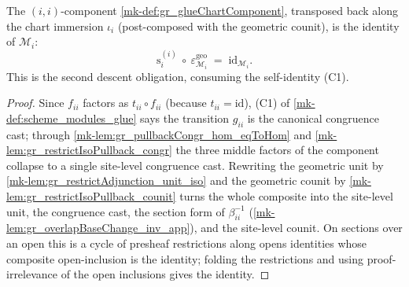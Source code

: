 \begin{lemma}\label{mk-lem:gr_glueChartComponent_self_counit}
  \leanok

  The \((i,i)\)-component \ref{mk-def:gr_glueChartComponent}, transposed back along the
  chart immersion \(\iota_i\) (post-composed with the geometric counit), is the
  identity of \(\mathcal{M}_i\):
  \[
    \mathrm{s}_i^{(i)}\ \circ\ \varepsilon^{\mathrm{geo}}_{\mathcal{M}_i}
      \;=\; \mathrm{id}_{\mathcal{M}_i}.
  \]
  This is the second descent obligation, consuming the self-identity (C1).
\end{lemma}
\begin{proof}
  \leanok
    Since \(f_{ii}\) factors as \(t_{ii}\circ f_{ii}\) (because \(t_{ii} = \mathrm{id}\)),
  (C1) of \ref{mk-def:scheme_modules_glue} says the transition \(g_{ii}\) is the
  canonical congruence cast; through \ref{mk-lem:gr_pullbackCongr_hom_eqToHom} and
  \ref{mk-lem:gr_restrictIsoPullback_congr} the three middle factors of the component
  collapse to a single site-level congruence cast. Rewriting the geometric unit by
  \ref{mk-lem:gr_restrictAdjunction_unit_iso} and the geometric counit by
  \ref{mk-lem:gr_restrictIsoPullback_counit} turns the whole composite into the
  site-level unit, the congruence cast, the section form of \(\beta_{ii}^{-1}\)
  (\ref{mk-lem:gr_overlapBaseChange_inv_app}), and the site-level counit. On sections
  over an open this is a cycle of presheaf restrictions along opens identities whose
  composite open-inclusion is the identity; folding the restrictions and using
  proof-irrelevance of the open inclusions gives the identity.
\end{proof}

